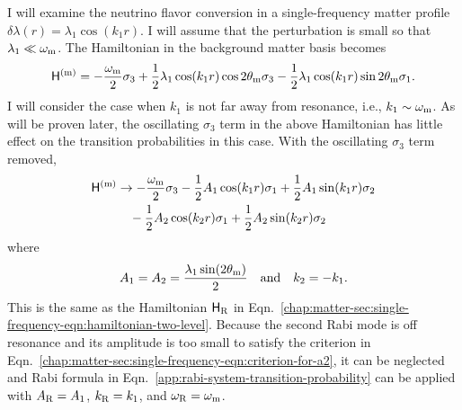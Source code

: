 I will examine the neutrino flavor conversion in a single-frequency matter profile $\delta\lambda(r) = \lambda_1 \cos(k_1 r)$. I will assume that the perturbation is small so that $\lambda_1 \ll \omega_\mathrm m$. The Hamiltonian in the background matter basis becomes
\begin{equation}
\mathsf H^{(\mm)} = - \frac{\omega_\mm}{2}\sigma_3  + \frac{1}{2} \lambda_1 \cos(k_1 r) \cos 2\theta_\mm \sigma_3 - \frac{1}{2} \lambda_1 \cos(k_1 r)\sin 2\theta_\mm \sigma_1.
\label{chap:matter-sec:single-fequency-eq:hamiltonian-bg-matter-basis-single-frequency}
\end{equation}
I will consider the case when $k_1$ is not far away from resonance, i.e., $k_1 \sim \omega_\mathrm m$. As will be proven later, the oscillating $\sigma_3$ term in the above Hamiltonian has little effect on the transition probabilities in this case. With the oscillating $\sigma_3$ term removed,
\begin{align}
    \mathsf H^{(\mm)} &\to -\frac{\omega_{\mathrm m}}{2} \sigma_3  - \frac{1}{2} A_1 \cos ( k_1 r)  \sigma_1 + \frac{1}{2} A_1\sin(k_1 r) \sigma_2 \nonumber\\
    &\phantom{\to} - \frac{1}{2} A_2 \cos ( k_2 r)  \sigma_1 + \frac{1}{2} A_2\sin(k_2 r) \sigma_2
    \label{eq-hamiltonian-bg-matter-basis-single-frequency}
\end{align}
where
\begin{align}
    A_1 = A_2 = \frac{\lambda_1 \sin(2\theta_\mm) }{2} \quad \text{and} \quad k_2 = -k_1.
    \label{chap:matter-sec:single-eqn:rabi-amplitudes}
\end{align}
This is the same as the Hamiltonian $\mathsf H_{\mathrm R}$ in Eqn.~\eqref{chap:matter-sec:single-frequency-eqn:hamiltonian-two-level}.
Because the second Rabi mode is off resonance and its amplitude is too small to satisfy the criterion in Eqn.~\eqref{chap:matter-sec:single-frequency-eqn:criterion-for-a2}, it can be neglected and Rabi formula in Eqn.~\eqref{app:rabi-system-transition-probability} can be applied with $A_\mathrm R=A_1$, $k_\mathrm R=k_1$, and $\omega_\mathrm R = \omega_\mathrm m$.

